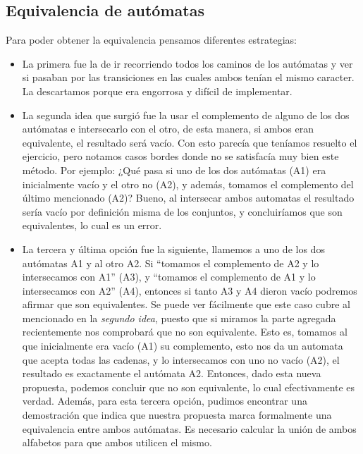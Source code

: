 \subsection{Equivalencia de autómatas}
Para poder obtener la equivalencia pensamos diferentes estrategias:
\begin{itemize}
\item La primera fue la de ir recorriendo todos los caminos de los autómatas y ver si pasaban por las transiciones en las cuales ambos tenían el mismo caracter. La descartamos porque era engorrosa y difícil de implementar.
\item La segunda idea que surgió fue la usar el complemento de alguno de los dos autómatas e intersecarlo con el otro, de esta manera, si ambos eran equivalente, el resultado será vacío. Con esto parecía que teníamos resuelto el ejercicio, pero notamos casos bordes donde no se satisfacía muy bien este método. Por ejemplo: ¿Qué pasa si uno de los dos autómatas (A1) era inicialmente vacío y el otro no (A2), y además, tomamos el complemento del último mencionado (A2)? Bueno, al intersecar ambos automatas el resultado sería vacío por definición misma de los conjuntos, y concluiríamos que son equivalentes, lo cual es un error.
\item La tercera y última opción fue la siguiente, llamemos a uno de los dos autómatas A1 y al otro A2. Si ``tomamos el complemento de A2 y lo intersecamos con A1'' (A3), y ``tomamos el complemento de A1 y lo intersecamos con A2'' (A4), entonces si tanto A3 y A4 dieron vacío podremos afirmar que son equivalentes. Se puede ver fácilmente que este caso cubre al mencionado en la \emph{segundo idea}, puesto que si miramos la parte agregada recientemente nos comprobará que no son equivalente. Esto es, tomamos al que inicialmente era vacío (A1) su complemento, esto nos da un automata que acepta todas las cadenas, y lo intersecamos con uno no vacío (A2), el resultado es exactamente el autómata A2. Entonces, dado esta nueva propuesta, podemos concluir que no son equivalente, lo cual efectivamente es verdad. Además, para esta tercera opción, pudimos encontrar una demostración que indica que nuestra propuesta marca formalmente una equivalencia entre ambos autómatas.
Es necesario calcular la unión de ambos alfabetos para que ambos utilicen el mismo.
\end{itemize}
